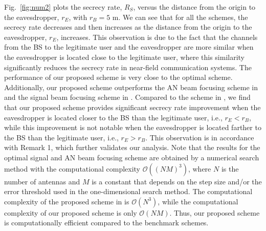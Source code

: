 \documentclass[10pt,technote]{IEEEtran}
\newcommand{\1}{\mathbbm{1}}
\begin{document}
Fig.~\ref{fig:num2} plots the secrecy rate, $R_S$, versus the distance from the origin to the eavesdropper, $r_E$, with $r_B = 5$ m. %
We can see that for all the schemes, the secrecy rate decreases and then increases as the distance from the origin to the eavesdropper, $r_E$, increases. This observation is due to the fact that the channels from the BS to the legitimate user and the eavesdropper are more similar when the eavesdropper is located close to the legitimate user, where this similarity significantly reduces the secrecy rate in near-field communication systems. The performance of our proposed scheme is very close to the optimal scheme. Additionally, our proposed scheme outperforms the AN beam focusing scheme in \cite{zhang2024performanceanalysislowcomplexitybeamforming} and the signal beam focusing scheme in \cite{Ali2024coml}. Compared to the scheme in \cite{Ali2024coml}, we find that our proposed scheme provides significant secrecy rate improvement when the eavesdropper is located closer to the BS than the legitimate user, i.e., $r_E<r_B$, while this improvement is not notable when the eavesdropper is located farther to the BS than the legitimate user, i.e., $r_E>r_B$. This observation is in accordance with Remark 1, which further validates our analysis. Note that the results for the optimal signal and AN beam focusing scheme are obtained by a numerical search method with the computational complexity $\mathcal{O}((NM)^3)$, where $N$ is the number of antennas and $M$ is a constant that depends on the step size and/or the error threshold used in the one-dimensional search method. The computational complexity of the proposed scheme in \cite{Ali2024coml} is $\mathcal{O}(N^3)$, while the computational complexity of our proposed scheme is only $\mathcal{O}(NM)$. Thus, our proposed scheme is computationally efficient compared to the benchmark schemes. %
\end{document}
